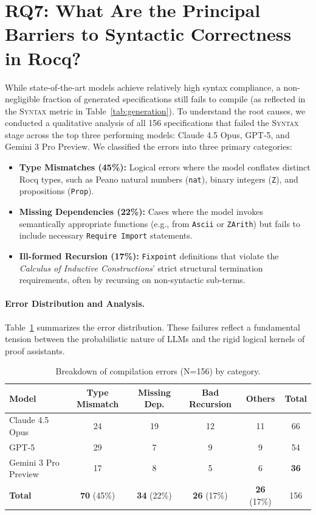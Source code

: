 \section{RQ7: What Are the Principal Barriers to Syntactic Correctness in Rocq?}
\label{appendix:rq7}

While state-of-the-art models achieve relatively high syntax compliance, a non-negligible fraction of generated specifications still fails to compile (as reflected in the \textsc{Syntax} metric in Table~\ref{tab:generation}). To understand the root causes, we conducted a qualitative analysis of all 156 specifications that failed the \textsc{Syntax} stage across the top three performing models: Claude 4.5 Opus, GPT-5, and Gemini 3 Pro Preview. We classified the errors into three primary categories:

\begin{itemize}
    \item \textbf{Type Mismatches (45\%):} Logical errors where the model conflates distinct Rocq types, such as Peano natural numbers (\texttt{nat}), binary integers (\texttt{Z}), and propositions (\texttt{Prop}).
    \item \textbf{Missing Dependencies (22\%):} Cases where the model invokes semantically appropriate functions (e.g., from \texttt{Ascii} or \texttt{ZArith}) but fails to include necessary \texttt{Require Import} statements.
    \item \textbf{Ill-formed Recursion (17\%):} \texttt{Fixpoint} definitions that violate the \textit{Calculus of Inductive Constructions}' strict structural termination requirements, often by recursing on non-syntactic sub-terms.
\end{itemize}

\paragraph{Error Distribution and Analysis.}
Table~\ref{tab:error-analysis} summarizes the error distribution. These failures reflect a fundamental tension between the probabilistic nature of LLMs and the rigid logical kernels of proof assistants.

\begin{table}[h]
\centering
\caption{Breakdown of compilation errors (N=156) by category.}
\label{tab:error-analysis}
\vskip 0.1in
\begin{tabular}{lccccc}
\toprule
\textbf{Model} & \textbf{Type Mismatch} & \textbf{Missing Dep.} & \textbf{Bad Recursion} & \textbf{Others} & \textbf{Total} \\
\midrule
Claude 4.5 Opus & 24 & 19 & 12 & 11 & 66 \\
GPT-5           & 29 & 7  & 9  & 9  & 54 \\
Gemini 3 Pro Preview   & 17 & 8  & 5  & 6  & \textbf{36} \\
\midrule
\textbf{Total}  & \textbf{70} (45\%) & \textbf{34} (22\%) & \textbf{26} (17\%) & \textbf{26} (17\%) & 156 \\
\bottomrule
\end{tabular}
\end{table}

